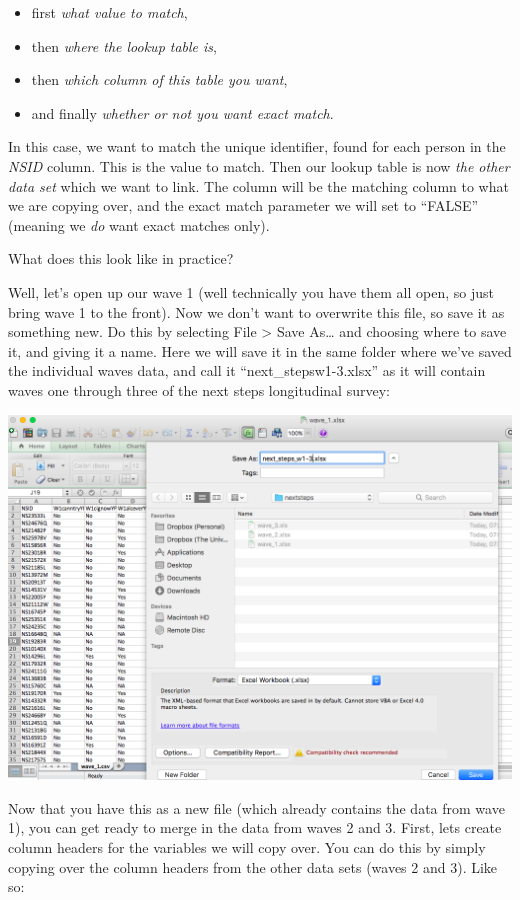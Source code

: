 \documentclass[
]{book}
\providecommand{\tightlist}{%
  \setlength{\itemsep}{0pt}\setlength{\parskip}{0pt}}
\begin{document}
\begin{itemize}
\tightlist
\item
  first \emph{what value to match},
\item
  then \emph{where the lookup table is},
\item
  then \emph{which column of this table you want},
\item
  and finally \emph{whether or not you want exact match}.
\end{itemize}

In this case, we want to match the unique identifier, found for each person in the \emph{NSID} column. This is the value to match. Then our lookup table is now \emph{the other data set} which we want to link. The column will be the matching column to what we are copying over, and the exact match parameter we will set to ``FALSE'' (meaning we \emph{do} want exact matches only).

What does this look like in practice?

Well, let's open up our wave 1 (well technically you have them all open, so just bring wave 1 to the front). Now we don't want to overwrite this file, so save it as something new. Do this by selecting File \textgreater{} Save As\ldots{} and choosing where to save it, and giving it a name. Here we will save it in the same folder where we've saved the individual waves data, and call it ``next\_stepsw1-3.xlsx'' as it will contain waves one through three of the next steps longitudinal survey:

\includegraphics{imgs/rename.png}

Now that you have this as a new file (which already contains the data from wave 1), you can get ready to merge in the data from waves 2 and 3. First, lets create column headers for the variables we will copy over. You can do this by simply copying over the column headers from the other data sets (waves 2 and 3). Like so:
\end{document}
